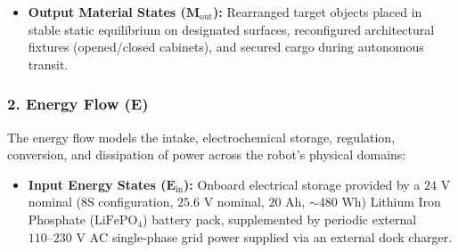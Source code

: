 \begin{itemize}[leftmargin=1.5em]
  \item \textbf{Output Material States ($\mathbf{M}_{\text{out}}$):}
  Rearranged target objects placed in stable static equilibrium on designated surfaces, reconfigured architectural fixtures (opened/closed cabinets), and secured cargo during autonomous transit.
\end{itemize}

\subsubsection{2. Energy Flow \texorpdfstring{($\mathbf{E}$)}{(E)}}
The energy flow models the intake, electrochemical storage, regulation, conversion, and dissipation of power across the robot's physical domains:
\begin{itemize}[leftmargin=1.5em]
  \item \textbf{Input Energy States ($\mathbf{E}_{\text{in}}$):}
  Onboard electrical storage provided by a $24\text{ V}$ nominal (8S configuration, $25.6\text{ V}$ nominal, $20\text{ Ah}$, $\sim 480\text{ Wh}$) Lithium Iron Phosphate ($\text{LiFePO}_4$) battery pack, supplemented by periodic external $110\text{--}230\text{ V AC}$ single-phase grid power supplied via an external dock charger.
  

\end{itemize}

